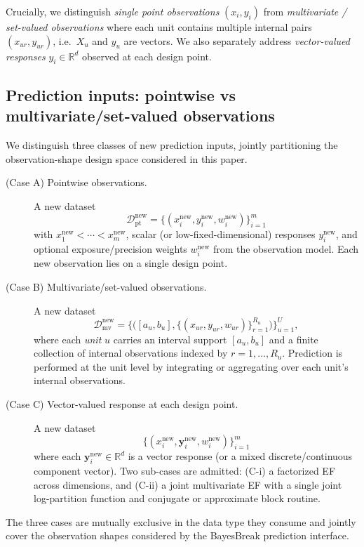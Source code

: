 Crucially, we distinguish \emph{single point observations} $(x_i,y_i)$ from
\emph{multivariate / set-valued observations} where each unit contains multiple internal
pairs $(x_{u r},y_{u r})$, i.e.\ $X_u$ and $y_u$ are vectors. We also separately address
\emph{vector-valued responses} $y_i\in\mathbb{R}^d$ observed at each design point.

\subsection{Prediction inputs: pointwise vs multivariate/set-valued observations}
\label{sec:prediction-inputs}

\begin{definition}
\label{def:prediction-cases}
We distinguish three classes of new prediction inputs, jointly partitioning the
observation-shape design space considered in this paper.
\begin{description}
\item[\textnormal{(Case A)} Pointwise observations.] A new dataset
\[
\mathcal{D}^{\mathrm{new}}_{\mathrm{pt}}
= \{(x_i^{\mathrm{new}}, y_i^{\mathrm{new}}, w_i^{\mathrm{new}})\}_{i=1}^m
\]
with $x_1^{\mathrm{new}}<\cdots<x_m^{\mathrm{new}}$, scalar (or low-fixed-dimensional)
responses $y_i^{\mathrm{new}}$, and optional exposure/precision weights
$w_i^{\mathrm{new}}$ from the observation model. Each new observation lies on a single
design point.
\item[\textnormal{(Case B)} Multivariate/set-valued observations.] A new dataset
\[
\mathcal{D}^{\mathrm{new}}_{\mathrm{mv}}
= \Big\{\big([a_u,b_u],\{(x_{ur},y_{ur},w_{ur})\}_{r=1}^{R_u}\big)\Big\}_{u=1}^U,
\]
where each \emph{unit} $u$ carries an interval support $[a_u,b_u]$ and a finite collection of
internal observations indexed by $r=1,\dots,R_u$. Prediction is performed at the unit level by
integrating or aggregating over each unit's internal observations.
\item[\textnormal{(Case C)} Vector-valued response at each design point.] A new dataset
\[
\{(x_i^{\mathrm{new}}, \mathbf{y}_i^{\mathrm{new}}, w_i^{\mathrm{new}})\}_{i=1}^m
\]
where each $\mathbf{y}_i^{\mathrm{new}}\in\mathbb{R}^d$ is a vector response (or a mixed
discrete/continuous component vector). Two sub-cases are admitted: (C-i) a factorized EF
across dimensions, and (C-ii) a joint multivariate EF with a single joint log-partition
function and conjugate or approximate block routine.
\end{description}
The three cases are mutually exclusive in the data type they consume and jointly cover the
observation shapes considered by the BayesBreak prediction interface.
\end{definition}

